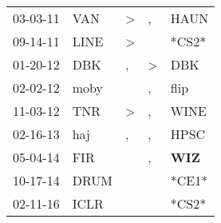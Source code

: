 \begin{supertabular}{p{0.07\textwidth}p{0.06\textwidth}p{0.02\textwidth}p{0.02\textwidth}p{0.06\textwidth}}
 03-03-11\textsuperscript{} &          VAN\textsuperscript{} &  \textgreater &             , &           HAUN\textsuperscript{} \\
 09-14-11\textsuperscript{} &         LINE\textsuperscript{} &  \textgreater &               &                            *CS2* \\
 01-20-12\textsuperscript{} &          DBK\textsuperscript{} &             , &  \textgreater &            DBK\textsuperscript{} \\
 02-02-12\textsuperscript{} &         moby\textsuperscript{} &               &             , &           flip\textsuperscript{} \\
 11-03-12\textsuperscript{} &          TNR\textsuperscript{} &  \textgreater &             , &           WINE\textsuperscript{} \\
 02-16-13\textsuperscript{} &          haj\textsuperscript{} &             , &             , &           HPSC\textsuperscript{} \\
 05-04-14\textsuperscript{} &          FIR\textsuperscript{} &               &             , &   \textbf{WIZ\textsuperscript{}} \\
 10-17-14\textsuperscript{} &         DRUM\textsuperscript{} &               &               &                            *CE1* \\
 02-11-16\textsuperscript{} &         ICLR\textsuperscript{} &               &               &                            *CS2* \\
\end{supertabular}
